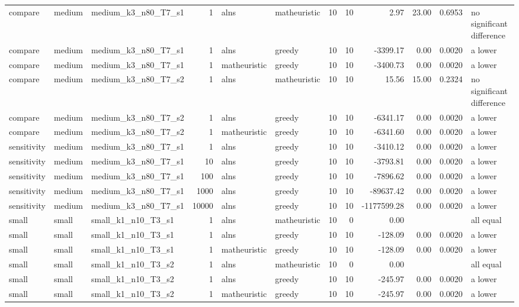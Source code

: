 \begin{tabular}{lllrllrrrrrl}
compare & medium & medium\_k3\_n80\_T7\_s1 & 1 & alns & matheuristic & 10 & 10 & 2.97 & 23.00 & 0.6953 & no significant difference \\
compare & medium & medium\_k3\_n80\_T7\_s1 & 1 & alns & greedy & 10 & 10 & -3399.17 & 0.00 & 0.0020 & a lower \\
compare & medium & medium\_k3\_n80\_T7\_s1 & 1 & matheuristic & greedy & 10 & 10 & -3400.73 & 0.00 & 0.0020 & a lower \\
compare & medium & medium\_k3\_n80\_T7\_s2 & 1 & alns & matheuristic & 10 & 10 & 15.56 & 15.00 & 0.2324 & no significant difference \\
compare & medium & medium\_k3\_n80\_T7\_s2 & 1 & alns & greedy & 10 & 10 & -6341.17 & 0.00 & 0.0020 & a lower \\
compare & medium & medium\_k3\_n80\_T7\_s2 & 1 & matheuristic & greedy & 10 & 10 & -6341.60 & 0.00 & 0.0020 & a lower \\
sensitivity & medium & medium\_k3\_n80\_T7\_s1 & 1 & alns & greedy & 10 & 10 & -3410.12 & 0.00 & 0.0020 & a lower \\
sensitivity & medium & medium\_k3\_n80\_T7\_s1 & 10 & alns & greedy & 10 & 10 & -3793.81 & 0.00 & 0.0020 & a lower \\
sensitivity & medium & medium\_k3\_n80\_T7\_s1 & 100 & alns & greedy & 10 & 10 & -7896.62 & 0.00 & 0.0020 & a lower \\
sensitivity & medium & medium\_k3\_n80\_T7\_s1 & 1000 & alns & greedy & 10 & 10 & -89637.42 & 0.00 & 0.0020 & a lower \\
sensitivity & medium & medium\_k3\_n80\_T7\_s1 & 10000 & alns & greedy & 10 & 10 & -1177599.28 & 0.00 & 0.0020 & a lower \\
small & small & small\_k1\_n10\_T3\_s1 & 1 & alns & matheuristic & 10 & 0 & 0.00 &  &  & all equal \\
small & small & small\_k1\_n10\_T3\_s1 & 1 & alns & greedy & 10 & 10 & -128.09 & 0.00 & 0.0020 & a lower \\
small & small & small\_k1\_n10\_T3\_s1 & 1 & matheuristic & greedy & 10 & 10 & -128.09 & 0.00 & 0.0020 & a lower \\
small & small & small\_k1\_n10\_T3\_s2 & 1 & alns & matheuristic & 10 & 0 & 0.00 &  &  & all equal \\
small & small & small\_k1\_n10\_T3\_s2 & 1 & alns & greedy & 10 & 10 & -245.97 & 0.00 & 0.0020 & a lower \\
small & small & small\_k1\_n10\_T3\_s2 & 1 & matheuristic & greedy & 10 & 10 & -245.97 & 0.00 & 0.0020 & a lower \\

\end{tabular}
